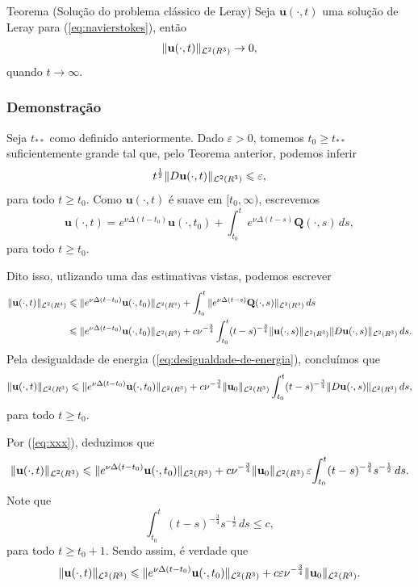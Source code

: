 \documentclass[xcolor=dvipsnames, aspectratio=169, 10pt]{beamer}
\let\mathbb\relax
\newcommand{\bR}{\mathbb{R}}
\newcommand{\bu}{\mathbf{u}}
\newcommand{\BQ}{\mathbf{Q}}
\newcommand{\cL}{\mathcal{L}}
\begin{document}
\begin{frame}
    \begin{block}{Teorema (Solução do problema clássico de Leray)}
    Seja $\bu(\cdot,t)$ uma solução de Leray para (\ref{eq:navierstokes}), então
    \[
        \Vert \bu(\cdot,t) \Vert_{\cL^2(\bR^3)}\to 0,
    \]
    quando $t \to \infty$.        
    \end{block}
\end{frame}
\begin{frame}
    \frametitle{Demonstração}
    Seja $t_{**}$ como definido anteriormente.
    Dado $\varepsilon > 0$, tomemos $t_0 \geqslant t_{**}$ suficientemente grande tal que, pelo Teorema anterior, podemos inferir
    \begin{equation} \label{eq:xxx}
        t^{\frac{1}{2}} \Vert D\bu(\cdot,t) \Vert_{\cL^2(\bR^3)} \leqslant \varepsilon,
    \end{equation}
    para todo $t \geqslant t_0$.
    Como $\bu(\cdot,t)$ é suave em $[t_0,\infty)$, escrevemos
    \begin{equation} \label{eq:2212}
        \bu(\cdot,t) = e^{\nu\Delta(t - t_0)} \bu(\cdot,t_0) + \int_{t_0}^{t} e^{\nu\Delta(t-s)}\BQ(\cdot,s) \, ds,
    \end{equation}
    para todo $t \geqslant t_0$.
\end{frame}
\begin{frame}
    Dito isso, utlizando uma das estimativas vistas, podemos escrever
    \[
        \begin{aligned}
            \Vert \bu(\cdot,t) \Vert_{\cL^2(\bR^3)} &\leqslant \Vert e^{\nu\Delta(t - t_0)} \bu(\cdot,t_0) \Vert_{\cL^2(\bR^3)} + \int_{t_0}^t \Vert e^{\nu\Delta(t-s)} \BQ(\cdot,s) \Vert_{\cL^2(\bR^3)}\,ds\\
            &\leqslant \Vert e^{\nu\Delta(t - t_0)} \bu(\cdot,t_0) \Vert_{\cL^2(\bR^3)} + c \nu^{-\frac{3}{4}} \int_{t_0}^t (t - s)^{-\frac{3}{4}} \Vert \bu(\cdot,s) \Vert_{\cL^2(\bR^3)} \Vert D\bu(\cdot,s) \Vert_{\cL^2(\bR^3)} \,ds.
        \end{aligned}
    \]
    Pela desigualdade de energia (\ref{eq:desigualdade-de-energia}), concluímos que
    \[
        \Vert \bu(\cdot,t) \Vert_{\cL^2(\bR^3)} \leqslant\Vert e^{\nu\Delta(t - t_0)} \bu(\cdot,t_0) \Vert_{\cL^2(\bR^3)} + c \nu^{-\frac{3}{4}} \Vert \bu_0 \Vert_{\cL^2(\bR^3)} \int_{t_0}^t (t - s)^{-\frac{3}{4}}\Vert D\bu(\cdot,s) \Vert_{\cL^2(\bR^3)} \,ds,
    \]
    para todo $t \geqslant t_0$.
\end{frame}
\begin{frame}
    Por (\ref{eq:xxx}), deduzimos que
    \[
        \Vert \bu(\cdot,t) \Vert_{\cL^2(\bR^3)} \leqslant \Vert e^{\nu\Delta(t - t_0)} \bu(\cdot,t_0) \Vert_{\cL^2(\bR^3)} + c \nu^{-\frac{3}{4}} \Vert \bu_0 \Vert_{\cL^2(\bR^3)}\, \varepsilon \! \int_{t_0}^t (t - s)^{-\frac{3}{4}} s^{-\frac{1}{2}} \,ds.
    \]
    Note que
    \[
        \int_{t_0}^t (t - s)^{-\frac{3}{4}}s^{-\frac{1}{2}}\,ds \leqslant c,
    \]
    para todo $t \geqslant t_0 + 1$. Sendo assim, é verdade que
    \[
        \Vert \bu(\cdot,t) \Vert_{\cL^2(\bR^3)} \leqslant \Vert e^{\nu\Delta(t - t_0)} \bu(\cdot,t_0) \Vert_{\cL^2(\bR^3)} + c\varepsilon\nu^{-\frac{3}{4}} \Vert \bu_0 \Vert_{\cL^2(\bR^3)}.
    \]
\end{frame}
\end{document}
